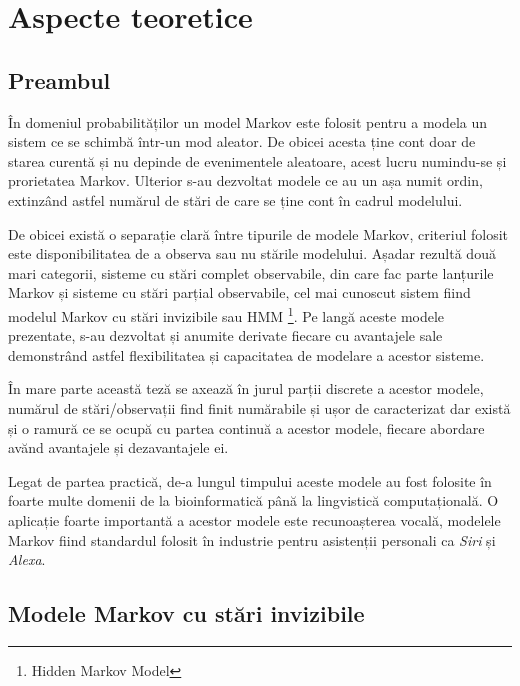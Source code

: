 \chapter{Aspecte teoretice}

\section{Preambul}

În domeniul probabilităților un model Markov este folosit pentru a modela un sistem ce se schimbă într-un mod aleator. De obicei acesta ține cont doar de starea curentă și nu depinde de evenimentele aleatoare, acest lucru numindu-se și prorietatea Markov. Ulterior s-au dezvoltat modele ce au un așa numit ordin, extinzând astfel numărul de stări de care se ține cont în cadrul modelului.\par

De obicei există o separație clară între tipurile de modele Markov, criteriul folosit este disponibilitatea de a observa sau nu stările modelului. Așadar rezultă două mari categorii, sisteme cu stări complet observabile, din care fac parte lanțurile Markov și sisteme cu stări parțial observabile, cel mai cunoscut sistem fiind modelul Markov cu stări invizibile sau HMM \footnote{Hidden Markov Model}. Pe langă aceste modele prezentate, s-au dezvoltat și anumite derivate fiecare cu avantajele sale demonstrând astfel flexibilitatea și capacitatea de modelare a acestor sisteme.\par

În mare parte această teză se axează în jurul parții discrete a acestor modele, numărul de stări/observații find finit numărabile și ușor de caracterizat dar există și o ramură ce se ocupă cu partea continuă a acestor modele, fiecare abordare avănd avantajele și dezavantajele ei.\par

Legat de partea practică, de-a lungul timpului aceste modele au fost folosite în foarte multe domenii de la bioinformatică până la lingvistică computațională. O aplicație foarte importantă a acestor modele este recunoașterea vocală, modelele Markov fiind standardul folosit în industrie pentru asistenții personali ca \textit{Siri} și \textit{Alexa}.\par

\section{Modele Markov cu stări invizibile}

